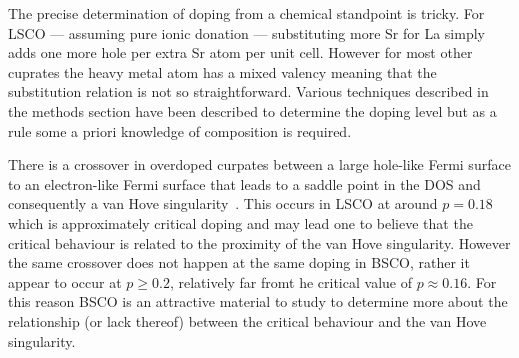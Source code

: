 The precise determination of doping from a chemical standpoint is tricky. For \ac{LSCO} --- assuming pure ionic donation --- substituting more Sr for La simply adds one more hole per extra Sr atom per unit cell. However for most other cuprates the heavy metal atom has a mixed valency meaning that the substitution relation is not so straightforward. Various techniques described in the methods section have been described to determine the doping level but as a rule some a priori knowledge of composition is required.

There is a crossover in overdoped curpates between a large hole-like Fermi surface to an electron-like Fermi surface that leads to a saddle point in the \ac{DOS} and consequently a van Hove singularity~. This occurs in \ac{LSCO} at around $p=0.18$ which is approximately critical doping and may lead one to believe that the critical behaviour is related to the proximity of the van Hove singularity. However the same crossover does not happen at the same doping in \ac{BSCO}, rather it appear to occur at $p \geq 0.2$, relatively far fromt he critical value of $p \approx 0.16$. For this reason \ac{BSCO} is an attractive material to study to determine more about the relationship (or lack thereof) between the critical behaviour and the van Hove singularity.

